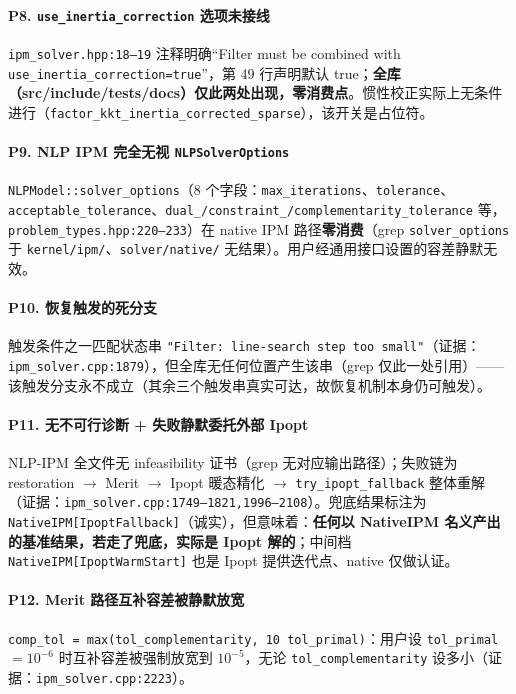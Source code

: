 \documentclass[11pt,a4paper]{ctexart}
\newcommand{\file}[1]{\texttt{#1}}
\newcommand{\func}[1]{\texttt{#1}}
\newcommand{\opt}[1]{\texttt{#1}}
\newcommand{\evid}[1]{{\footnotesize\color{black!70}（证据：#1）}}
\begin{document}
\paragraph{P8. \opt{use\_inertia\_correction} 选项未接线}
\file{ipm\_solver.hpp:18--19} 注释明确``Filter must be combined with \opt{use\_inertia\_correction=true}''，第 49 行声明默认 true；\textbf{全库（src/include/tests/docs）仅此两处出现，零消费点}。惯性校正实际上无条件进行（\func{factor\_kkt\_inertia\_corrected\_sparse}），该开关是占位符。

\paragraph{P9. NLP IPM 完全无视 \opt{NLPSolverOptions}}
\func{NLPModel::solver\_options}（8 个字段：\opt{max\_iterations}、\opt{tolerance}、\opt{acceptable\_tolerance}、\opt{dual\_/constraint\_/complementarity\_tolerance} 等，\file{problem\_types.hpp:220--233}）在 native IPM 路径\textbf{零消费}（grep \opt{solver\_options} 于 \file{kernel/ipm/}、\file{solver/native/} 无结果）。用户经通用接口设置的容差静默无效。

\paragraph{P10. 恢复触发的死分支}
触发条件之一匹配状态串 \texttt{"Filter: line-search step too small"}\evid{\file{ipm\_solver.cpp:1879}}，但全库无任何位置产生该串（grep 仅此一处引用）——该触发分支永不成立（其余三个触发串真实可达，故恢复机制本身仍可触发）。

\paragraph{P11. 无不可行诊断 + 失败静默委托外部 Ipopt}
NLP-IPM 全文件无 infeasibility 证书（grep 无对应输出路径）；失败链为 restoration $\to$ Merit $\to$ Ipopt 暖态精化 $\to$ \func{try\_ipopt\_fallback} 整体重解\evid{\file{ipm\_solver.cpp:1749--1821,1996--2108}}。兜底结果标注为 \texttt{NativeIPM[IpoptFallback]}（诚实），但意味着：\textbf{任何以 NativeIPM 名义产出的基准结果，若走了兜底，实际是 Ipopt 解的}；中间档 \texttt{NativeIPM[IpoptWarmStart]} 也是 Ipopt 提供迭代点、native 仅做认证。

\paragraph{P12. Merit 路径互补容差被静默放宽}
\opt{comp\_tol = max(tol\_complementarity, 10\,tol\_primal)}：用户设 \opt{tol\_primal}${=}10^{-6}$ 时互补容差被强制放宽到 $10^{-5}$，无论 \opt{tol\_complementarity} 设多小\evid{\file{ipm\_solver.cpp:2223}}。
\end{document}
